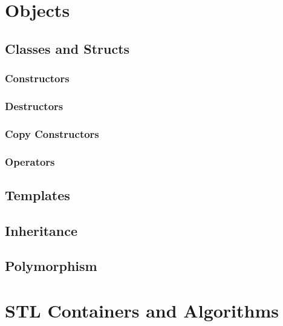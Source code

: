 \documentclass[11pt,fancy,authoryear]{elegantbook}
\begin{document}
\chapter{Objects}

\section{Classes and Structs}

\subsection{Constructors}

\subsection{Destructors}

\subsection{Copy Constructors}

\subsection{Operators}

\section{Templates}

\section{Inheritance}

\section{Polymorphism}

\chapter{STL Containers and Algorithms}
\end{document}
